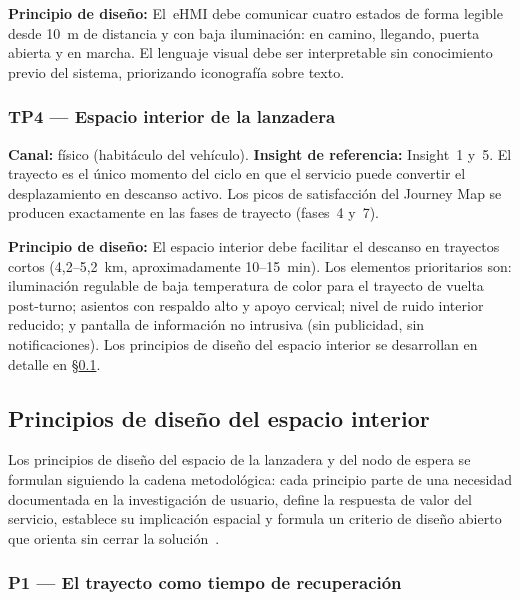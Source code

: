 \textbf{Principio de diseño:} El~\acs{eHMI} debe comunicar cuatro
estados de forma legible desde 10~m de distancia y con baja
iluminación: en camino, llegando, puerta abierta y en marcha.
El lenguaje visual debe ser interpretable sin conocimiento previo
del sistema, priorizando iconografía sobre texto.

\subsubsection{TP4 — Espacio interior de la lanzadera}
\label{sec:tp4}

\textbf{Canal:} físico (habitáculo del vehículo).
\textbf{Insight de referencia:} Insight~1 y~5. El trayecto es el
único momento del ciclo en que el servicio puede convertir el
desplazamiento en descanso activo. Los picos de satisfacción del
Journey Map se producen exactamente en las fases de trayecto
(fases~4 y~7).

\textbf{Principio de diseño:} El espacio interior debe facilitar
el descanso en trayectos cortos (4,2--5,2~km,
aproximadamente 10--15~min). Los elementos prioritarios son:
iluminación regulable de baja temperatura de color para el
trayecto de vuelta post-turno; asientos con respaldo alto y
apoyo cervical; nivel de ruido interior reducido; y pantalla de
información no intrusiva (sin publicidad, sin notificaciones).
Los principios de diseño del espacio interior se desarrollan
en detalle en §\ref{sec:espacio-interior}.

\subsection{Principios de diseño del espacio interior}
\label{sec:espacio-interior}

Los principios de diseño del espacio de la lanzadera y del nodo
de espera se formulan siguiendo la cadena metodológica: cada
principio parte de una necesidad documentada en la investigación
de usuario, define la respuesta de valor del servicio, establece
su implicación espacial y formula un criterio de diseño abierto
que orienta sin cerrar la solución~\parencite{LouridoRegueira2026}.


\subsubsection{P1 — El trayecto como tiempo de recuperación}
\label{sec:p1-descanso}

